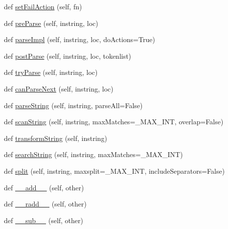 \begin{DoxyCompactItemize}
def \hyperlink{classpip_1_1__vendor_1_1pyparsing_1_1ParserElement_aa62d86fd6bd6479e74f0af4e743612a3}{set\+Fail\+Action} (self, fn)
\item 
def \hyperlink{classpip_1_1__vendor_1_1pyparsing_1_1ParserElement_a34d0267785f41e654e901648baab7649}{pre\+Parse} (self, instring, loc)
\item 
def \hyperlink{classpip_1_1__vendor_1_1pyparsing_1_1ParserElement_a6b2d3f63ecb4d2e406dfaca22f33901a}{parse\+Impl} (self, instring, loc, do\+Actions=True)
\item 
def \hyperlink{classpip_1_1__vendor_1_1pyparsing_1_1ParserElement_a3dd7af04f05341b7bdb3d045ed25094a}{post\+Parse} (self, instring, loc, tokenlist)
\item 
def \hyperlink{classpip_1_1__vendor_1_1pyparsing_1_1ParserElement_a5ae937dc1d5970a3838ac12b7c64cfac}{try\+Parse} (self, instring, loc)
\item 
def \hyperlink{classpip_1_1__vendor_1_1pyparsing_1_1ParserElement_acd312823031264fcad42f4755b1c7172}{can\+Parse\+Next} (self, instring, loc)
\item 
def \hyperlink{classpip_1_1__vendor_1_1pyparsing_1_1ParserElement_af2fadff2831dce8c0b70c0cfb9b3557d}{parse\+String} (self, instring, parse\+All=False)
\item 
def \hyperlink{classpip_1_1__vendor_1_1pyparsing_1_1ParserElement_aa5daff52b40d5b79a6402005f48e942f}{scan\+String} (self, instring, max\+Matches=\+\_\+\+M\+A\+X\+\_\+\+I\+NT, overlap=False)
\item 
def \hyperlink{classpip_1_1__vendor_1_1pyparsing_1_1ParserElement_af2799a3c5f3d6c1375c9ebbe19df9b26}{transform\+String} (self, instring)
\item 
def \hyperlink{classpip_1_1__vendor_1_1pyparsing_1_1ParserElement_ae5f4ccf19736562549ddbdc0765088e2}{search\+String} (self, instring, max\+Matches=\+\_\+\+M\+A\+X\+\_\+\+I\+NT)
\item 
def \hyperlink{classpip_1_1__vendor_1_1pyparsing_1_1ParserElement_a54e5d160b02e08447f1ae58e65dcaaf2}{split} (self, instring, maxsplit=\+\_\+\+M\+A\+X\+\_\+\+I\+NT, include\+Separators=False)
\item 
def \hyperlink{classpip_1_1__vendor_1_1pyparsing_1_1ParserElement_a0d585e312acf3c39459f56ac77effdd7}{\+\_\+\+\_\+add\+\_\+\+\_\+} (self, other)
\item 
def \hyperlink{classpip_1_1__vendor_1_1pyparsing_1_1ParserElement_a1728413d9b642937db40132257fe7c32}{\+\_\+\+\_\+radd\+\_\+\+\_\+} (self, other)
\item 
def \hyperlink{classpip_1_1__vendor_1_1pyparsing_1_1ParserElement_a8fd848441a4c5801ae043a224e9caf37}{\+\_\+\+\_\+sub\+\_\+\+\_\+} (self, other)

\end{DoxyCompactItemize}
